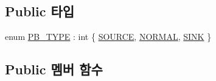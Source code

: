\subsection*{Public 타입}
\begin{DoxyCompactItemize}
\item 
enum \hyperlink{classProcessingBlock_a7101250aa8b5a80fb331ea50ddabda01}{P\+B\+\_\+\+T\+Y\+PE} \+: int \{ \hyperlink{classProcessingBlock_a7101250aa8b5a80fb331ea50ddabda01a4591f1828300dd01148df46297fca9a3}{S\+O\+U\+R\+CE}, 
\hyperlink{classProcessingBlock_a7101250aa8b5a80fb331ea50ddabda01afa0a5bb3bc7be7ed974375040245673c}{N\+O\+R\+M\+AL}, 
\hyperlink{classProcessingBlock_a7101250aa8b5a80fb331ea50ddabda01a0fe46c9c9004b40629b43e11e6acfb25}{S\+I\+NK}
 \}
\end{DoxyCompactItemize}
\subsection*{Public 멤버 함수}
